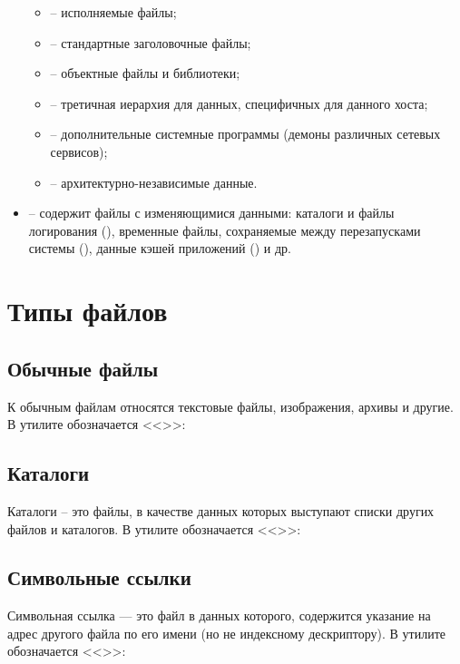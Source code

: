 \begin{itemize}
	\begin{itemize}[topsep=0em]
		\item {} -- исполняемые файлы;
		\item {} -- стандартные заголовочные файлы;
		\item {} -- объектные файлы и библиотеки;
		\item {} -- третичная иерархия для данных, специфичных для данного хоста;
		\item {} -- дополнительные системные программы (демоны различных сетевых сервисов);
		\item {} -- архитектурно-независимые данные.
	\end{itemize}
	\item {} -- содержит файлы с изменяющимися данными: каталоги и файлы логирования (), временные файлы, сохраняемые между перезапусками системы (), данные кэшей приложений () и др. 
\end{itemize}

\newpage

\section{Типы файлов}

\subsection{Обычные файлы}

К обычным файлам относятся текстовые файлы, изображения, архивы и другие. В утилите  обозначается <<\code{-}>>:


\subsection{Каталоги}

Каталоги -- это файлы, в качестве данных которых выступают списки других файлов и каталогов. В утилите  обозначается <<>>:


\subsection{Символьные ссылки}

Символьная ссылка — это файл в данных которого, содержится указание на адрес другого файла по его имени (но не индексному дескриптору). В утилите  обозначается <<>>:


